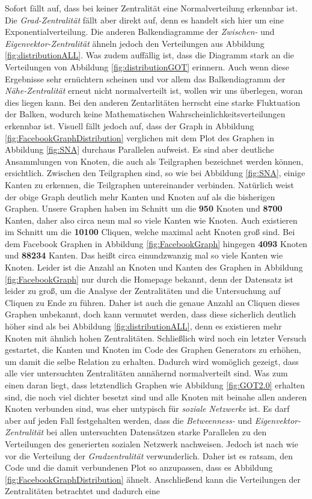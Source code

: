 Sofort fällt auf, dass bei keiner Zentralität eine Normalverteilung erkennbar ist. Die \textit{Grad-Zentralität} fällt aber direkt auf, denn es handelt sich hier um eine Exponentialverteilung. Die anderen Balkendiagramme der \textit{Zwischen-} und \textit{Eigenvektor-Zentralität} ähneln jedoch den Verteilungen aus Abbildung \ref{fig:distributionALL}. Was zudem auffällig ist, dass die Diagramm stark an die Verteilungen von Abbildung \ref{fig:distributionGOT} erinnern. Auch wenn diese Ergebnisse sehr ernüchtern scheinen und vor allem das Balkendiagramm der \textit{Nähe-Zentralität} erneut nicht normalverteilt ist, wollen wir uns überlegen, woran dies liegen kann. Bei den anderen Zentarlitäten herrscht eine starke Fluktuation der Balken, wodurch keine Mathematischen Wahrscheinlichkeitsverteilungen erkennbar ist. Visuell fällt jedoch auf, dass der Graph in Abbildung \ref{fig:FacebookGraphDistribution} verglichen mit dem Plot des Graphen in Abbildung \ref{fig:SNA} durchaus Parallelen aufweist. Es sind aber deutliche Ansammlungen von Knoten, die auch als Teilgraphen bezeichnet werden können, ersichtlich. Zwischen den Teilgraphen sind, so wie bei Abbildung \ref{fig:SNA}, einige Kanten zu erkennen, die Teilgraphen untereinander verbinden. Natürlich weist der obige Graph deutlich mehr Kanten und Knoten auf als die bisherigen Graphen. Unsere Graphen haben im Schnitt um die \textbf{950} Knoten und \textbf{8700} Kanten, daher also circa neun mal so viele Kanten wie Knoten. Auch existieren im Schnitt um die \textbf{10100} Cliquen, welche maximal acht Knoten groß sind. Bei dem Facebook Graphen in Abbildung \ref{fig:FacebookGraph} hingegen \textbf{4093} Knoten und \textbf{88234} Kanten. Das heißt circa einundzwanzig mal so viele Kanten wie Knoten. Leider ist die Anzahl an Knoten und Kanten des Graphen in Abbildung \ref{fig:FacebookGraph} nur durch die Homepage \cite{FBData} bekannt, denn der Datensatz ist leider zu groß, um die Analyse der Zentralitäten und die Untersuchung auf Cliquen zu Ende zu führen. Daher ist auch die genaue Anzahl an Cliquen dieses Graphen unbekannt, doch kann vermutet werden, dass diese sicherlich deutlich höher sind als bei Abbildung \ref{fig:distributionALL}, denn es existieren mehr Knoten mit ähnlich hohen Zentralitäten. Schließlich wird noch ein letzter Versuch gestartet, die Kanten und Knoten im Code des Graphen Generators zu erhöhen, um damit die selbe Relation zu erhalten. Dadurch wird womöglich gezeigt, dass alle vier untersuchten Zentralitäten annähernd normalverteilt sind. Was zum einen daran liegt, dass letztendlich Graphen wie Abbildung \ref{fig:GOT2.0} erhalten sind, die noch viel dichter besetzt sind und alle Knoten mit beinahe allen anderen Knoten verbunden sind, was eher untypisch für \textit{soziale Netzwerke} ist. Es darf aber auf jeden Fall festgehalten werden, dass die \textit{Betweenness-} und \textit{Eigenvektor-Zentralität} bei allen untersuchten Datensätzen starke Parallelen zu den Verteilungen des generierten sozialen Netzwerk nachweisen. Jedoch ist nach wie vor die Verteilung der \textit{Gradzentralität} verwunderlich. Daher ist es ratsam, den Code und die damit verbundenen Plot so anzupassen, dass es Abbildung \ref{fig:FacebookGraphDistribution} ähnelt. Anschließend kann die Verteilungen der Zentralitäten betrachtet und dadurch eine 